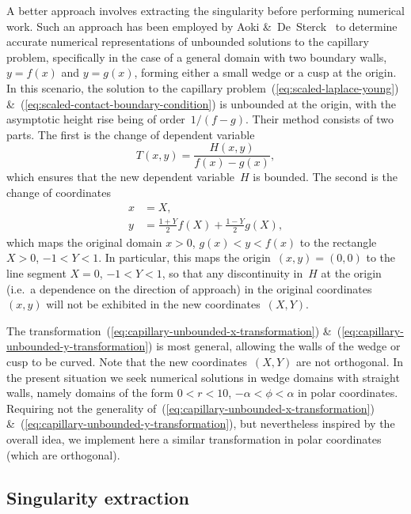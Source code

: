A better approach involves extracting the singularity
before performing numerical work.
Such an approach has been employed by
Aoki \&~De~Sterck~\cite{aoki-2014-numerical-study-unbounded-capillary}
to determine accurate numerical representations
of unbounded solutions to the capillary problem,
specifically in the case of a general domain with two boundary walls,
$y = f (x)$ and $y = g (x)$,
forming either a small wedge or a cusp at the origin.
In this scenario,
the solution to the capillary problem~(\ref{eq:scaled-laplace-young})
\&~(\ref{eq:scaled-contact-boundary-condition})
is unbounded at the origin,
with the asymptotic height rise being of order~$1 / (f - g)$.
Their method consists of two parts.
The first is the change of dependent variable
\begin{equation}
  T (x, y) = \frac{H (x, y)}{f (x) - g(x)},
  \label{eq:capillary-unbounded-change-of-variable}
\end{equation}
which ensures that the new dependent variable~$H$ is bounded.
The second is the change of coordinates
\begin{align}
  x &= X,
    \label{eq:capillary-unbounded-x-transformation} \\
  y &= \frac{1 + Y}{2} f (X) + \frac{1 - Y}{2} g (X),
    \label{eq:capillary-unbounded-y-transformation}
\end{align}
which maps the original domain $x > 0$, $g (x) < y < f (x)$
to the rectangle $X > 0$, $-1 < Y < 1$.
In particular, this maps the origin~$(x, y) = (0, 0)$
to the line segment $X = 0$, $-1 < Y < 1$,
so that any discontinuity in~$H$ at the origin
(i.e.~a dependence on the direction of approach)
in the original coordinates~$(x, y)$
will not be exhibited in the new coordinates~$(X, Y)$.

The transformation~(\ref{eq:capillary-unbounded-x-transformation})
\&~(\ref{eq:capillary-unbounded-y-transformation})
is most general,
allowing the walls of the wedge or cusp to be curved.
Note that the new coordinates~$(X, Y)$ are not orthogonal.
In the present situation
we seek numerical solutions in wedge domains with straight walls,
namely domains of the form
$0 < r < 10$, $-\alpha < \phi < \alpha$
in polar coordinates.
Requiring not the generality of~(\ref{eq:capillary-unbounded-x-transformation})
\&~(\ref{eq:capillary-unbounded-y-transformation}),
but nevertheless inspired by the overall idea,
we implement here a similar transformation in polar coordinates
(which are orthogonal).

\subsection{Singularity extraction}
\label{sec:small.numerical.extraction}

